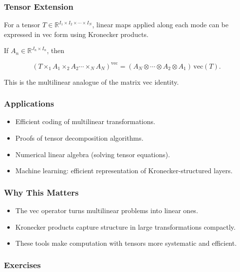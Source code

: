 \documentclass[
  letterpaper,
  DIV=11,
  numbers=noendperiod]{scrreprt}
\providecommand{\tightlist}{%
  \setlength{\itemsep}{0pt}\setlength{\parskip}{0pt}}
\begin{document}
\subsubsection{Tensor Extension}\label{tensor-extension}

For a tensor
\(T \in \mathbb{R}^{I_1 \times I_2 \times \cdots \times I_N}\), linear
maps applied along each mode can be expressed in vec form using
Kronecker products.

If \(A_n \in \mathbb{R}^{J_n \times I_n}\), then

\[
(T \times_1 A_1 \times_2 A_2 \cdots \times_N A_N)^{\mathrm{vec}} = (A_N \otimes \cdots \otimes A_2 \otimes A_1) \, \mathrm{vec}(T).
\]

This is the multilinear analogue of the matrix vec identity.

\subsubsection{Applications}\label{applications-1}

\begin{itemize}
\tightlist
\item
  Efficient coding of multilinear transformations.
\item
  Proofs of tensor decomposition algorithms.
\item
  Numerical linear algebra (solving tensor equations).
\item
  Machine learning: efficient representation of Kronecker-structured
  layers.
\end{itemize}

\subsubsection{Why This Matters}\label{why-this-matters-28}

\begin{itemize}
\tightlist
\item
  The vec operator turns multilinear problems into linear ones.
\item
  Kronecker products capture structure in large transformations
  compactly.
\item
  These tools make computation with tensors more systematic and
  efficient.
\end{itemize}

\subsubsection{Exercises}\label{exercises-41}
\end{document}
